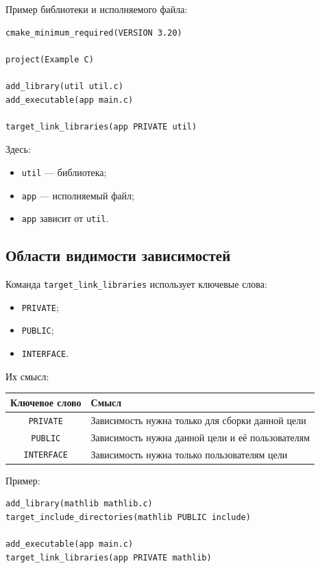 \documentclass[12pt,a4paper]{article}
\begin{document}
Пример библиотеки и исполняемого файла:

\begin{lstlisting}
cmake_minimum_required(VERSION 3.20)

project(Example C)

add_library(util util.c)
add_executable(app main.c)

target_link_libraries(app PRIVATE util)
\end{lstlisting}

Здесь:
\begin{itemize}
    \item \texttt{util} --- библиотека;
    \item \texttt{app} --- исполняемый файл;
    \item \texttt{app} зависит от \texttt{util}.
\end{itemize}

\subsection{Области видимости зависимостей}

Команда \texttt{target\_link\_libraries} использует ключевые слова:
\begin{itemize}
    \item \texttt{PRIVATE};
    \item \texttt{PUBLIC};
    \item \texttt{INTERFACE}.
\end{itemize}

Их смысл:

\begin{center}
\begin{tabular}{|c|p{10cm}|}
\hline
Ключевое слово & Смысл \\
\hline
\texttt{PRIVATE} & Зависимость нужна только для сборки данной цели \\
\hline
\texttt{PUBLIC} & Зависимость нужна данной цели и её пользователям \\
\hline
\texttt{INTERFACE} & Зависимость нужна только пользователям цели \\
\hline
\end{tabular}
\end{center}

Пример:

\begin{lstlisting}
add_library(mathlib mathlib.c)
target_include_directories(mathlib PUBLIC include)

add_executable(app main.c)
target_link_libraries(app PRIVATE mathlib)
\end{lstlisting}
\end{document}
